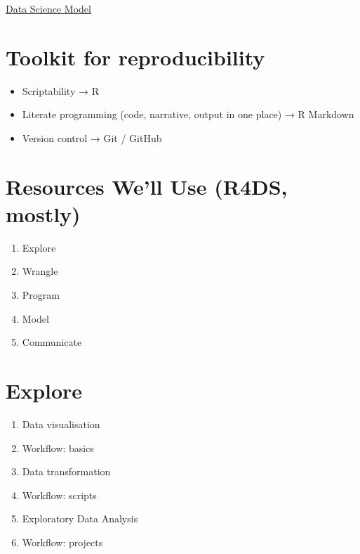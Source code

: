 \documentclass[
]{book}
\providecommand{\tightlist}{%
  \setlength{\itemsep}{0pt}\setlength{\parskip}{0pt}}
\theoremstyle{definition}
\theoremstyle{definition}
\theoremstyle{definition}
\theoremstyle{definition}
\theoremstyle{remark}
\begin{document}
\href{https://d33wubrfki0l68.cloudfront.net/571b056757d68e6df81a3e3853f54d3c76ad6efc/32d37/diagrams/data-science.png}{Data Science Model}

\hypertarget{toolkit-for-reproducibility}{%
\section{Toolkit for reproducibility}\label{toolkit-for-reproducibility}}

\begin{itemize}
\tightlist
\item
  Scriptability → R
\item
  Literate programming (code, narrative, output in one place) → R Markdown
\item
  Version control → Git / GitHub
\end{itemize}

\hypertarget{resources-well-use-r4ds-mostly}{%
\section{Resources We'll Use (R4DS, mostly)}\label{resources-well-use-r4ds-mostly}}

\begin{enumerate}
\def\labelenumi{\arabic{enumi})}
\tightlist
\item
  Explore
\item
  Wrangle
\item
  Program
\item
  Model
\item
  Communicate
\end{enumerate}

\hypertarget{explore}{%
\section{Explore}\label{explore}}

\begin{enumerate}
\def\labelenumi{\arabic{enumi})}
\setcounter{enumi}{2}
\tightlist
\item
  Data visualisation
\item
  Workflow: basics
\item
  Data transformation
\item
  Workflow: scripts
\item
  Exploratory Data Analysis
\item
  Workflow: projects
\end{enumerate}
\end{document}
